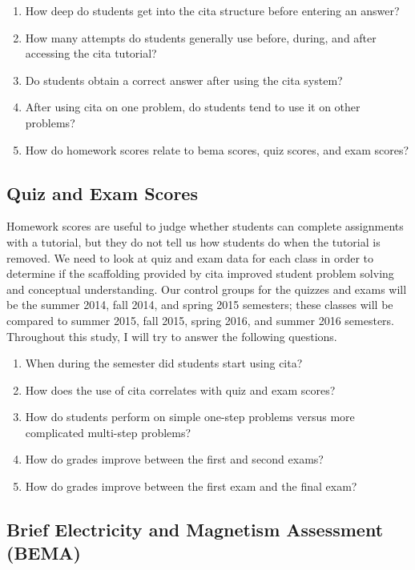 \begin{enumerate}
\item How deep do students get into the \gls{cita} structure before entering an answer?
\item How many attempts do students generally use before, during, and after accessing the \gls{cita} tutorial?
\item Do students obtain a correct answer after using the \gls{cita} system?
\item After using \gls{cita} on one problem, do students tend to use it on other problems?
\item How do homework scores relate to \gls{bema} scores, quiz scores, and exam scores?
\end{enumerate}

\subsection{Quiz and Exam Scores}

Homework scores are useful to judge whether students can complete assignments with a tutorial, but they do not tell us how students do when the tutorial is removed. We need to look at quiz and exam data for each class in order to determine if the scaffolding provided by \gls{cita} improved student problem solving and conceptual understanding. Our control groups for the quizzes and exams will be the summer 2014, fall 2014, and spring 2015 semesters; these classes will be compared to summer 2015, fall 2015, spring 2016, and summer 2016 semesters. Throughout this study, I will try to answer the following questions.

\begin{enumerate}
\item When during the semester did students start using \gls{cita}?
\item How does the use of \gls{cita} correlates with quiz and exam scores?
\item How do students perform on simple one-step problems versus more complicated multi-step problems?
\item How do grades improve between the first and second exams?
\item How do grades improve between the first exam and the final exam?
\end{enumerate}

\subsection{Brief Electricity and Magnetism Assessment (BEMA)}

